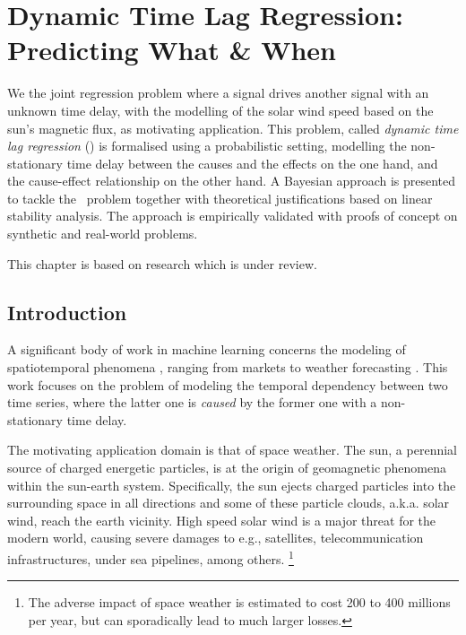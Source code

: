 \chapter{Dynamic Time Lag Regression: Predicting What \& When}\label{chapter:pdt}

{\small
  We the joint regression problem where a signal drives another signal with an unknown time delay, with the modelling 
  of the solar wind speed based on the sun's magnetic flux, as motivating application. This problem, called 
  \emph{dynamic time lag regression} (\XX) is formalised using a probabilistic setting, modelling the non-stationary 
  time delay between the causes and the effects on the one hand, and the cause-effect relationship on the other hand. 
  A Bayesian approach is presented to tackle the \XX\ problem together with theoretical justifications based on 
  linear stability analysis. The approach is empirically validated with proofs of concept on synthetic and 
  real-world problems. 
}


\vfill
{}
\vfill

\noindent
    \parbox{\textwidth}{%
        {\small This chapter is based on research which is under review.}
    }%


\clearpage


\section{Introduction}\label{sec:intro}
A significant body of work in machine learning concerns the modeling of spatiotemporal phenomena 
\citep{SurveyST,NIPSForecasting18}, ranging from markets \citep{Pedreschi} to weather forecasting 
\citep{Horvitz}. This work focuses on the problem of modeling the temporal dependency between two time series, 
where the latter one is {\em caused} by the former one \citep{Granger} with a non-stationary time delay. 

The motivating application domain is that of space weather. The sun, a perennial source of charged energetic particles, 
is at the origin of geomagnetic phenomena within the sun-earth system. Specifically, the sun ejects 
charged particles into the surrounding space in all directions and some of these particle clouds, a.k.a. solar wind, 
reach the earth vicinity. High speed solar wind is a major threat for the modern world, causing severe damages to 
e.g., satellites, telecommunication infrastructures, under sea pipelines, among others.
\footnote{The adverse impact of space weather is estimated to cost 200 to 400 millions per year, 
but can sporadically lead to much larger losses.} 

